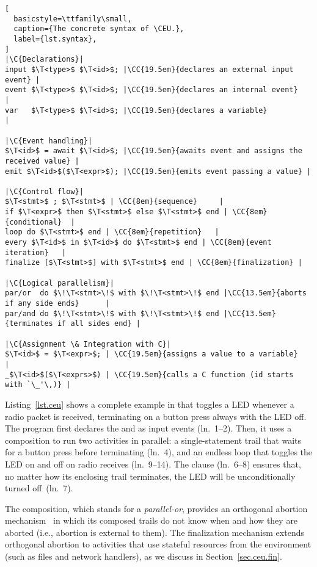 \def\C#1{\rmfamily\itshape//~#1}
\def\CC#1#2{\hfill\makebox[#1][l]{\C{#2}}}
\def\T<#1>{\langle\mathit{#1}\rangle}
\bgroup
\begin{lstlisting}[
  basicstyle=\ttfamily\small,
  caption={The concrete syntax of \CEU.},
  label={lst.syntax},
]
|\C{Declarations}|
input $\T<type>$ $\T<id>$; |\CC{19.5em}{declares an external input event} |
event $\T<type>$ $\T<id>$; |\CC{19.5em}{declares an internal event}       |
var   $\T<type>$ $\T<id>$; |\CC{19.5em}{declares a variable}              |

|\C{Event handling}|
$\T<id>$ = await $\T<id>$; |\CC{19.5em}{awaits event and assigns the received value} |
emit $\T<id>$($\T<expr>$); |\CC{19.5em}{emits event passing a value} |

|\C{Control flow}|
$\T<stmt>$ ; $\T<stmt>$ | \CC{8em}{sequence}     |
if $\T<expr>$ then $\T<stmt>$ else $\T<stmt>$ end | \CC{8em}{conditional}  |
loop do $\T<stmt>$ end | \CC{8em}{repetition}   |
every $\T<id>$ in $\T<id>$ do $\T<stmt>$ end | \CC{8em}{event iteration}   |
finalize [$\T<stmt>$] with $\T<stmt>$ end | \CC{8em}{finalization} |

|\C{Logical parallelism}|
par/or  do $\!\T<stmt>\!$ with $\!\T<stmt>\!$ end |\CC{13.5em}{aborts if any side ends}      |
par/and do $\!\T<stmt>\!$ with $\!\T<stmt>\!$ end |\CC{13.5em}{terminates if all sides end} |

|\C{Assignment \& Integration with C}|
$\T<id>$ = $\T<expr>$; | \CC{19.5em}{assigns a value to a variable}              |
_$\T<id>$($\T<exprs>$) | \CC{19.5em}{calls a C function (id starts with `\_'\,)} |
\end{lstlisting}
\egroup

Listing~\ref{lst.ceu} shows a complete example in \CEU that toggles a LED
whenever a radio packet is received, terminating on a button press always
with the LED off.
%
The program first declares the  and  as
input events (ln.~1--2).
Then, it uses a  composition to run two activities in parallel:
a single-statement trail that waits for a button press before terminating
(ln.~4), and an endless loop that toggles the LED on and off on radio receives
(ln.~9--14).
The  clause (ln.~6--8) ensures that, no matter how its enclosing
trail terminates, the LED will be unconditionally turned off~(ln.~7).

The  composition, which stands for a \emph{parallel-or}, provides
an orthogonal abortion mechanism~\cite{esterel.preemption} in which its
composed trails do not know when and how they are aborted (i.e., abortion is
external to them).
%
%
The finalization mechanism extends orthogonal abortion to %
activities that use stateful resources from the environment (such as files and
network handlers), as we discuss in Section~\ref{sec.ceu.fin}.
%

